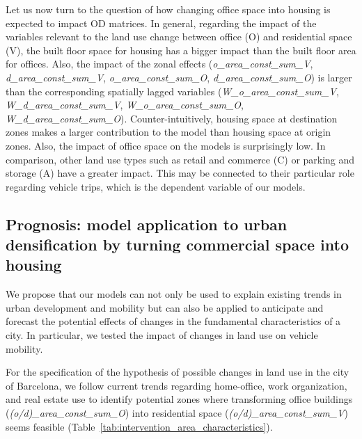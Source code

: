 Let us now turn to the question of how changing office space into housing is expected to impact OD matrices.
In general, regarding the impact of the variables relevant to the land use change between office (O) and residential space (V), the built floor space for housing has a bigger impact than the built floor area for offices. Also, the impact of the zonal effects (\emph{o\_area\_const\_sum\_V}, \emph{d\_area\_const\_sum\_V}, \emph{o\_area\_const\_sum\_O}, \emph{d\_area\_const\_sum\_O}) is larger than the corresponding spatially lagged variables (\emph{W\_o\_area\_const\_sum\_V}, \emph{W\_d\_area\_const\_sum\_V}, \emph{W\_o\_area\_const\_sum\_O}, \emph{W\_d\_area\_const\_sum\_O}). Counter-intuitively, housing space at destination zones makes a larger contribution to the model than housing space at origin zones. Also, the impact of office space on the models is surprisingly low. In comparison, other land use types such as retail and commerce (C) or parking and storage (A) have a greater impact. This may be connected to their particular role regarding vehicle trips, which is the dependent variable of our models.

\subsection{Prognosis: model application to urban densification by turning commercial space into housing}
\label{subsec:ETRCO2H_prognosis}

We propose that our models can not only be used to explain existing trends in urban development and mobility but can also be applied to anticipate and forecast the potential effects of changes in the fundamental characteristics of a city. In particular, we tested the impact of changes in land use on vehicle mobility. 

For the specification of the hypothesis of possible changes in land use in the city of Barcelona, we follow current trends regarding home-office, work organization, and real estate use to identify potential zones where transforming office buildings (\textit{(o/d)\_area\_const\_sum\_O}) into residential space (\textit{(o/d)\_area\_const\_sum\_V}) seems feasible \citep{EYStrategyandTransactions2023The2023} (Table~\ref{tab:intervention_area_characteristics}).



